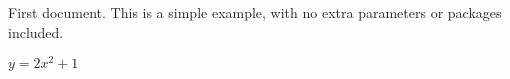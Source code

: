 \documentclass{article}
\begin{document}
First document. This is a simple example, with no 
extra parameters or packages included.
\begin{flushleft}
$y=2x^2 + 1$
\end{flushleft}
\end{document}
